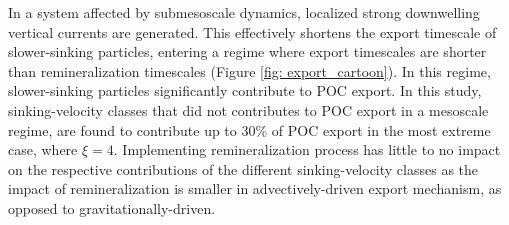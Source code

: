 \documentclass[draft,linenumbers]{agujournal2018}
\begin{document}
In a system affected by submesoscale dynamics, localized strong downwelling vertical currents are generated. This effectively shortens the export timescale of slower-sinking particles, entering a regime where export timescales are shorter than remineralization timescales (Figure \ref{fig: export_cartoon}). In this regime, slower-sinking particles significantly contribute to POC export. In this study, sinking-velocity classes that did not contributes to POC export in a mesoscale regime, are found to contribute up to 30\% of POC export in the most extreme case, where $\xi =4$. Implementing remineralization process has little to no impact on the respective contributions of the different sinking-velocity classes as the impact of remineralization is smaller in advectively-driven export mechanism, as opposed to gravitationally-driven.
\end{document}
